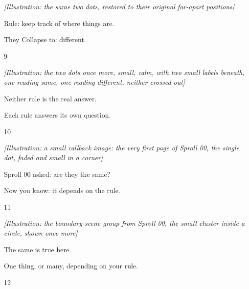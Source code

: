 \documentclass[12pt]{book}
\newcommand{\artnote}[1]{{\color{gray!70}\small\itshape [Illustration: #1]}\par\vspace{0.3in}}
\newcommand{\bigline}[1]{{\Huge #1}\par}
\newcommand{\pagenum}[1]{\vfill{\color{gray!50}\footnotesize #1}}
\newcommand{\sprollpage}{\newpage\vspace*{0.4in}}
\begin{document}
\sprollpage
\begin{center}
\vspace*{0.4in}
\artnote{the same two dots, restored to their original far-apart positions}
\vspace{2.0in}
\bigline{Rule: keep track of where things are.}\vspace{0.1in}
{\Large They Collapse to: different.}
\end{center}
\pagenum{9}

\sprollpage
\begin{center}
\vspace*{0.8in}
\artnote{the two dots once more, small, calm, with two small labels beneath, one reading same, one reading different, neither crossed out}
\vspace{0.35in}
\bigline{Neither rule is the real answer.}\vspace{0.1in}
{\Large Each rule answers its own question.}
\end{center}
\pagenum{10}

\sprollpage
\begin{center}
\vspace*{0.7in}
\artnote{a small callback image: the very first page of Sproll 00, the single dot, faded and small in a corner}
\vspace{0.35in}
\bigline{Sproll 00 asked: are they the same?}\vspace{0.1in}
{\Large Now you know: it depends on the rule.}
\end{center}
\pagenum{11}

\sprollpage
\begin{center}
\vspace*{0.7in}
\artnote{the boundary-scene group from Sproll 00, the small cluster inside a circle, shown once more}
\vspace{0.3in}
\bigline{The same is true here.}\vspace{0.1in}
{\Large One thing, or many, depending on your rule.}
\end{center}
\pagenum{12}
\end{document}
